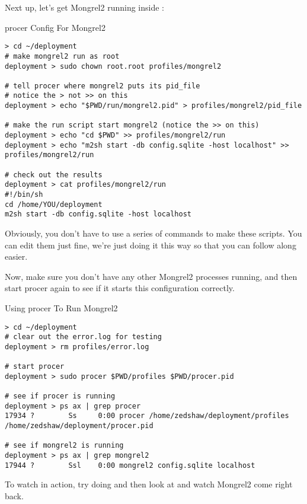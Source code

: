 Next up, let's get Mongrel2 running inside :

\begin{code}{procer Config For Mongrel2}
\begin{Verbatim}
> cd ~/deployment
# make mongrel2 run as root
deployment > sudo chown root.root profiles/mongrel2

# tell procer where mongrel2 puts its pid_file
# notice the > not >> on this
deployment > echo "$PWD/run/mongrel2.pid" > profiles/mongrel2/pid_file

# make the run script start mongrel2 (notice the >> on this)
deployment > echo "cd $PWD" >> profiles/mongrel2/run
deployment > echo "m2sh start -db config.sqlite -host localhost" >> profiles/mongrel2/run

# check out the results
deployment > cat profiles/mongrel2/run
#!/bin/sh
cd /home/YOU/deployment
m2sh start -db config.sqlite -host localhost
\end{Verbatim}
\end{code}

Obviously, you don't have to use a series of  commands to
make these scripts.  You can edit them just fine, we're just doing it
this way so that you can follow along easier.

Now, make sure you don't have any other Mongrel2 processes running,
and then start procer again to see if it starts this configuration
correctly.


\begin{code}{Using procer To Run Mongrel2}
\begin{Verbatim}
> cd ~/deployment
# clear out the error.log for testing
deployment > rm profiles/error.log

# start procer
deployment > sudo procer $PWD/profiles $PWD/procer.pid

# see if procer is running
deployment > ps ax | grep procer
17934 ?        Ss     0:00 procer /home/zedshaw/deployment/profiles /home/zedshaw/deployment/procer.pid

# see if mongrel2 is running
deployment > ps ax | grep mongrel2
17944 ?        Ssl    0:00 mongrel2 config.sqlite localhost

\end{Verbatim}
\end{code}

To watch  in action, try doing  and then look at  and watch
Mongrel2 come right back.


